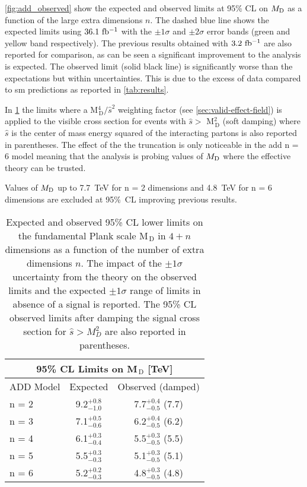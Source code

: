 \cref{fig:add_observed} show the expected and observed limits at 95\% CL on
$M_\mathrm{D}$ as a function of the large extra dimensions $n$. The dashed blue line
shows the expected limits using $36.1~\mbox{fb$^{-1}$}$ with the $\pm 1 \sigma$ and
$\pm 2 \sigma$ error bands (green and yellow band respectively). The previous
results obtained with $3.2~\mbox{fb$^{-1}$}$ are also reported for comparison, as can be
seen a significant improvement to the analysis is expected. The observed limit
(solid black line) is significantly worse than the expectations but within
uncertainties. This is due to the excess of data compared to \gls{sm}
predictions as reported in \cref{tab:results}.

In \cref{tab:add_limits} the limits where a M$^4_\mathrm{\, D} / \hat{s}^2$
weighting factor (see \cref{sec:valid-effect-field}) is applied to the visible
cross section for events with $\hat{s} > $ M$^2_\mathrm{\, D}$ (soft damping)
where $\hat{s}$ is the center of mass energy squared of the interacting partons
is also reported in parentheses. The effect of the the truncation is only
noticeable in the \gls{add} n = 6 model meaning that the analysis is probing
values of $M_\mathrm{D}$ where the effective theory can be trusted.

Values of $M_\mathrm{D}$ up to 7.7~TeV for n = 2 dimensions and 4.8~TeV for n = 6
dimensions are excluded at 95\%~CL improving previous results.
\begin{table}[!hb]
  \centering
  \begin{tabular}{lcc}
    \toprule
    \multicolumn{3}{c}{95\% CL Limits on M$_\mathrm{\, D}$
    [TeV]} \\
    \midrule \midrule
    ADD Model & Expected & Observed (damped) \\
    \midrule
    n = 2 & 9.2$^{+0.8}_{-1.0}$ & 7.7$^{+0.4}_{-0.5}$ (7.7) \B \\
    n = 3 & 7.1$^{+0.5}_{-0.6}$ & 6.2$^{+0.4}_{-0.5}$ (6.2) \T \B \\
    n = 4 & 6.1$^{+0.3}_{-0.4}$ & 5.5$^{+0.3}_{-0.5}$ (5.5) \T \B \\
    n = 5 & 5.5$^{+0.3}_{-0.3}$ & 5.1$^{+0.3}_{-0.5}$ (5.1) \T \B \\
    n = 6 & 5.2$^{+0.2}_{-0.3}$ & 4.8$^{+0.3}_{-0.5}$ (4.8) \T \\
    \bottomrule
  \end{tabular}
  \caption{Expected and observed 95\% CL lower limits on the fundamental Plank
      scale M$_\mathrm{\, D}$ in $4 + n$ dimensions as a function of the number
      of extra dimensions $n$. The impact of the $\pm 1 \sigma$ uncertainty from
      the theory on the observed limits and the expected $\pm 1 \sigma$ range of
      limits in absence of a signal is reported. The 95\% CL observed limits
      after damping the signal cross section for $\hat{s} > M_D^2$ are also
      reported in parentheses.}
  \label{tab:add_limits}
\end{table}

